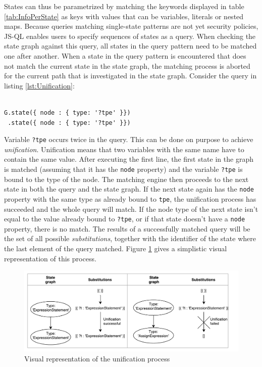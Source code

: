 \noindent States can thus be parametrized by matching the keywords displayed in table \ref{tab:InfoPerState} as keys with values that can be variables, literals or nested maps. Because queries matching single-state patterns are not yet security policies, JS-QL enables users to specify sequences of states as a query. When checking the state graph against this query, all states in the query pattern need to be matched one after another. When a state in the query pattern is encountered that does not match the current state in the state graph, the matching process is aborted for the current path that is investigated in the state graph. Consider the query in listing \ref{lst:Unification}:

\begin{lstlisting}[label={lst:Unification},language=JSQL,caption=Unification in JS-QL,mathescape=true]  % float=t?

G.state({ node : { type: '?tpe' }})
 .state({ node : { type: '?tpe' }})
\end{lstlisting}

\noindent Variable \texttt{?tpe} occurs twice in the query. This can be done on purpose to achieve \textit{unification}. Unification means that two variables with the same name have to contain the same value. After executing the first line, the first state in the graph is matched (assuming that it has the \texttt{node} property) and the variable \texttt{?tpe} is bound to the type of the node. The matching engine then proceeds to the next state in both the query and the state graph. If the next state again has the \texttt{node} property with the same type as already bound to \texttt{tpe}, the unification process has succeeded and the whole query will match. If the node type of the next state isn't equal to the value already bound to \texttt{?tpe}, or if that state doesn't have a \texttt{node} property, there is no match. The results of a successfully matched query will be the set of all possible \textit{substitutions}, together with the identifier of the state where the last element of the query matched. Figure \ref{fig:Unification} gives a simplistic visual representation of this process.

\begin{figure}[!h]
    \centering
      \includegraphics[width=1\textwidth]{images/Unification} 
      \caption{Visual representation of the unification process}
    \label{fig:Unification}
\end{figure}

